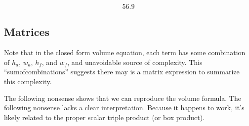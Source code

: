 \documentclass[letterpaper,10pt,english]{sphinxmanual}
\begin{document}
\begin{sphinxVerbatim}[commandchars=\\\{\}]
\end{sphinxVerbatim}
\begin{equation*}
\begin{split}\displaystyle 56.9\end{split}
\end{equation*}

\subsection{Matrices}
\label{\detokenize{prism-irregular:matrices}}
\sphinxAtStartPar
Note that in the closed form volume equation, each term has some combination of \(h_a\), \(w_a\), \(h_f\), and \(w_f\), and unavoidable source of complexity. This “sum\sphinxhyphen{}of\sphinxhyphen{}combinations” suggests there may is a matrix expression to summarize this complexity.

\sphinxAtStartPar
The following nonsense shows that we can reproduce the volume formula. The following nonsense lacks a clear interpretation. Because it happens to work, it’s likely related to the proper scalar triple product (or box product).

\begin{sphinxVerbatim}[commandchars=\\\{\}]
  \PYG{p}{[} \PYG{p}{]}
  \PYG{p}{[} \PYG{p}{]}
\end{sphinxVerbatim}
\end{document}

